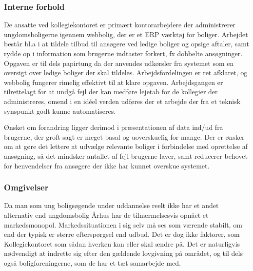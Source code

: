 \documentclass[12pt, a4paper]{report}
\begin{document}
  \subsubsection{Interne forhold}
De ansatte ved kollegiekontoret er primært kontorarbejdere der administrerer ungdomsboligerne igennem webbolig, der er et ERP værktøj for boliger. Arbejdet består bl.a i at tildele tilbud til ansøgere ved ledige boliger og opsige aftaler, samt rydde op i information som brugerne indtaster forkert, fx dobbelte ansøgninger. Opgaven er til dels papirtung da der anvendes udkørsler fra systemet som en oversigt over ledige boliger der skal tildeles. Arbejdsfordelingen er ret afklaret, og webbolig fungerer rimelig effektivt til at klare opgaven. Arbejdsgangen er tilrettelagt for at undgå fejl der kan medføre lejetab for de kollegier der administreres, omend i en idéel verden udføres der et arbejde der fra et teknisk synspunkt godt kunne automatiseres.

Ønsket om forandring ligger derimod i præsentationen af data ind/ud fra brugerne, der groft sagt er meget basal og uoverskuelig for mange. Der er ønsker om at gøre det lettere at udvælge relevante boliger i forbindelse med oprettelse af ansøgning, så det mindsker antallet af fejl brugerne laver, samt reducerer behovet for henvendelser fra ansøgere der ikke har kunnet overskue systemet.

  \subsubsection{Omgivelser}
Da man som ung boligsøgende under uddannelse reelt ikke har et andet alternativ end ungdomsbolig Århus har de tilnærmelsesvis opnået et markedsmonopol. Markedssituationen i sig selv må ses som værende stabilt, om end der typisk er større efterspørgsel end udbud. Det er dog ikke faktorer, som Kollegiekontoret som sådan hverken kan eller skal ændre på. Det er naturligvis nødvendigt at indrette sig efter den gældende lovgivning på området, og til dels også boligforeningerne, som de har et tæt samarbejde med.
\end{document}
